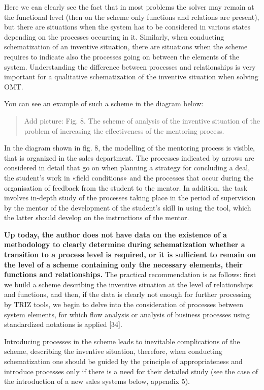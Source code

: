 \documentclass[11pt,a4paper]{book}
\newcommand{\addpicture}[1]{
  \begin{quote} Add picture: #1\end{quote}
}
\begin{document}
Here we can clearly see the fact that in most problems the solver may remain
at the functional level (then on the scheme only functions and relations are
present), but there are situations when the system has to be considered in
various states depending on the processes occurring in it. Similarly, when
conducting schematization of an inventive situation, there are situations when
the scheme requires to indicate also the processes going on between the
elements of the system. Understanding the difference between processes and
relationships is very important for a qualitative schematization of the
inventive situation when solving OMT.

You can see an example of such a scheme in the diagram below:

\addpicture{Fig. 8. The scheme of analysis of the inventive situation of the
  problem of increasing the effectiveness of the mentoring process.}

In the diagram shown in fig. 8, the modelling of the mentoring process is
visible, that is organized in the sales department. The processes indicated by
arrows are considered in detail that go on when planning a strategy for
concluding a deal, the student’s work in «field conditions» and the processes
that occur during the organisation of feedback from the student to the mentor.
In addition, the task involves in-depth study of the processes taking place in
the period of supervision by the mentor of the development of the student's
skill in using the tool, which the latter should develop on the instructions
of the mentor.

\textbf{Up today, the author does not have data on the existence of a
  methodology to clearly determine during schematization whether a transition
  to a process level is required, or it is sufficient to remain on the level
  of a scheme containing only the necessary elements, their functions and
  relationships.} The practical recommendation is as follows: first we build a
scheme describing the inventive situation at the level of relationships and
functions, and then, if the data is clearly not enough for further processing
by TRIZ tools, we begin to delve into the consideration of processes between
system elements, for which flow analysis or analysis of business processes
using standardized notations is applied [34].

Introducing processes in the scheme leads to inevitable complications of the
scheme, describing the inventive situation, therefore, when conducting
schematization one should be guided by the principle of appropriateness and
introduce processes only if there is a need for their detailed study (see the
case of the introduction of a new sales systems below, appendix 5).
\end{document}

